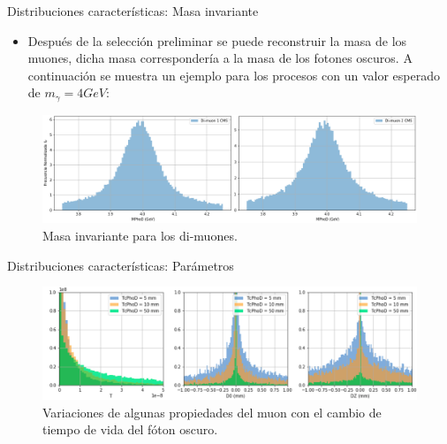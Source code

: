 \begin{frame}{Distribuciones caracter\'isticas: Masa invariante}
    
\begin{itemize}
\item Despu\'es de la selecci\'on preliminar se puede reconstruir la masa de los muones, dicha masa corresponder\'ia a la masa de los fotones oscuros. A continuaci\'on se muestra un ejemplo para los procesos con un valor esperado de $m_\gamma = 4 GeV$: 
\end{itemize}
    
\begin{figure}[ht]
\centering
\includegraphics[width=1\textwidth]{Imag/Datos_Photon4muon_CORTE_CMS.png}
\caption{Masa invariante para los di-muones.}
\end{figure}
\end{frame}



\begin{frame}{Distribuciones caracter\'isticas: Par\'ametros}

\begin{figure}[h]
\centering
\includegraphics[width=1\textwidth]{Imag/variar_parametros.png}
\caption{Variaciones de algunas propiedades del muon con el cambio de tiempo de vida del f\'oton oscuro.}
\end{figure} 

\end{frame}


